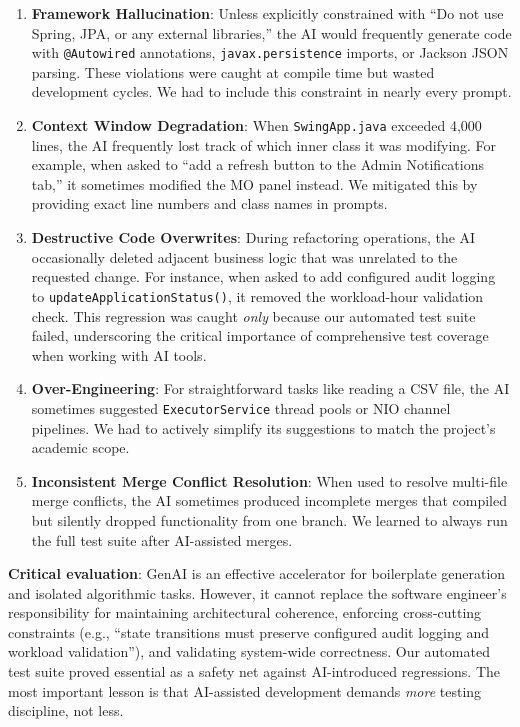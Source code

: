 \documentclass[12pt, a4paper]{article}
\begin{document}
\begin{enumerate}
    \item \textbf{Framework Hallucination}: Unless explicitly constrained with ``Do not use Spring, JPA, or any external libraries,'' the AI would frequently generate code with \texttt{@Autowired} annotations, \texttt{javax.persistence} imports, or Jackson JSON parsing. These violations were caught at compile time but wasted development cycles. We had to include this constraint in nearly every prompt.
    
    \item \textbf{Context Window Degradation}: When \texttt{SwingApp.java} exceeded 4,000 lines, the AI frequently lost track of which inner class it was modifying. For example, when asked to ``add a refresh button to the Admin Notifications tab,'' it sometimes modified the MO panel instead. We mitigated this by providing exact line numbers and class names in prompts.
    
    \item \textbf{Destructive Code Overwrites}: During refactoring operations, the AI occasionally deleted adjacent business logic that was unrelated to the requested change. For instance, when asked to add configured audit logging to \texttt{updateApplicationStatus()}, it removed the workload-hour validation check. This regression was caught \textit{only} because our automated test suite failed, underscoring the critical importance of comprehensive test coverage when working with AI tools.
    
    \item \textbf{Over-Engineering}: For straightforward tasks like reading a CSV file, the AI sometimes suggested \texttt{ExecutorService} thread pools or NIO channel pipelines. We had to actively simplify its suggestions to match the project's academic scope.
    
    \item \textbf{Inconsistent Merge Conflict Resolution}: When used to resolve multi-file merge conflicts, the AI sometimes produced incomplete merges that compiled but silently dropped functionality from one branch. We learned to always run the full test suite after AI-assisted merges.
\end{enumerate}

\textbf{Critical evaluation}: GenAI is an effective accelerator for boilerplate generation and isolated algorithmic tasks. However, it cannot replace the software engineer's responsibility for maintaining architectural coherence, enforcing cross-cutting constraints (e.g., ``state transitions must preserve configured audit logging and workload validation''), and validating system-wide correctness. Our automated test suite proved essential as a safety net against AI-introduced regressions. The most important lesson is that AI-assisted development demands \textit{more} testing discipline, not less.
\end{document}
